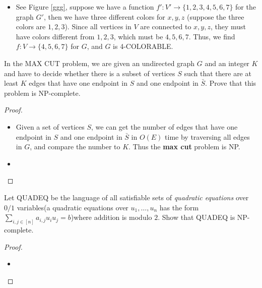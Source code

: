 \documentclass{article}
\newcounter{exercise}
\newcommand{\<}{
    \langle}
\renewcommand{\>}{
    \rangle}
\begin{document}
{\begin{itemize}
\item See Figure \ref{ggg}, suppose we have a function $f':V'\rightarrow \{1,2,3,4,5,6,7\}$ for the graph $G'$, then we have three different colors for $x,y,z$ (suppose the three colors are $1,2,3$). Since all vertices in $V$ are connected to $x,y,z$, they must have colors different from $1,2,3$, which must be $4,5,6,7$. Thus, we find $f:V\rightarrow \{4,5,6,7\}$ for $G$, and $G$ is 4-COLORABLE.

\end{itemize}

\newpage


\begin{exercise}
In the \textsf{MAX CUT} problem, we are given an undirected graph $G$ and an integer $K$ and have to decide whether there is a subset of vertices $S$ such that there are at least $K$ edges that have one endpoint in $S$ and one endpoint in $\bar{S}$. Prove that this problem is NP-complete.
\end{exercise}
\begin{proof}
    \leavevmode\newline
    \begin{itemize}
        \item Given a set of vertices $S$, we can get the number of edges that have one endpoint in $S$ and one endpoint in $\bar{S}$ in $O(E)$ time by traversing all edges in $G$, and compare the number to $K$. Thus the \textbf{max cut} problem is NP.
        \item 
    \end{itemize}
\end{proof}

\newpage


\begin{exercise}
Let \textsf{QUADEQ} be the language of all satisfiable sets of \textit{quadratic equations} over $0/1$ variables(a quadratic equations over $u_1,\ldots,u_n$ has the form $\sum_{i,j\in[n]}a_{i,j}u_iu_j=b$)where addition is modulo $2$. Show that \textsf{QUADEQ} is NP-complete.
\end{exercise}
\begin{proof}
    \leavevmode\newline
    \begin{itemize}
        \item 
    \end{itemize}
\end{proof}
\newpage


}
\end{document}
